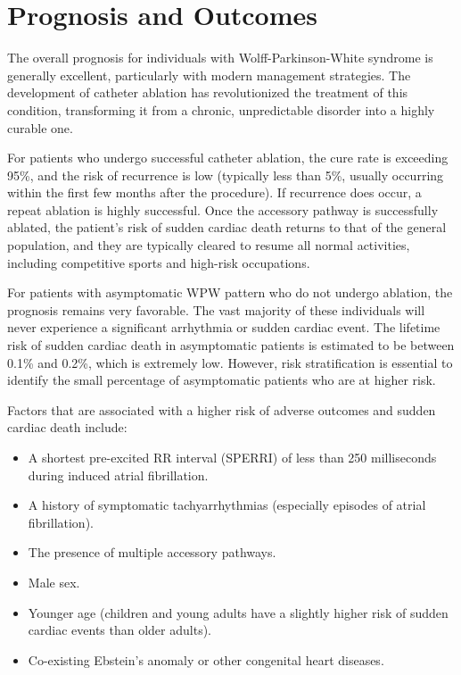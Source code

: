 \section*{Prognosis and Outcomes}
The overall prognosis for individuals with Wolff-Parkinson-White syndrome is generally excellent, particularly with modern management strategies. The development of catheter ablation has revolutionized the treatment of this condition, transforming it from a chronic, unpredictable disorder into a highly curable one.

For patients who undergo successful catheter ablation, the cure rate is exceeding 95\%, and the risk of recurrence is low (typically less than 5\%, usually occurring within the first few months after the procedure). If recurrence does occur, a repeat ablation is highly successful. Once the accessory pathway is successfully ablated, the patient's risk of sudden cardiac death returns to that of the general population, and they are typically cleared to resume all normal activities, including competitive sports and high-risk occupations.

For patients with asymptomatic WPW pattern who do not undergo ablation, the prognosis remains very favorable. The vast majority of these individuals will never experience a significant arrhythmia or sudden cardiac event. The lifetime risk of sudden cardiac death in asymptomatic patients is estimated to be between 0.1\% and 0.2\%, which is extremely low. However, risk stratification is essential to identify the small percentage of asymptomatic patients who are at higher risk.

Factors that are associated with a higher risk of adverse outcomes and sudden cardiac death include:
\begin{itemize}
  \item A shortest pre-excited RR interval (SPERRI) of less than 250 milliseconds during induced atrial fibrillation.
  \item A history of symptomatic tachyarrhythmias (especially episodes of atrial fibrillation).
  \item The presence of multiple accessory pathways.
  \item Male sex.
  \item Younger age (children and young adults have a slightly higher risk of sudden cardiac events than older adults).
  \item Co-existing Ebstein's anomaly or other congenital heart diseases.
\end{itemize}

